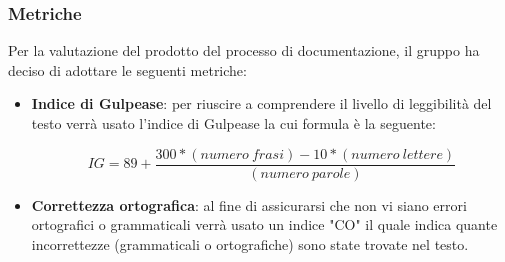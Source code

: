 \subsubsection{Metriche}
Per la valutazione del prodotto del processo di documentazione, il gruppo ha deciso di adottare le seguenti metriche:
\begin{itemize}
	\item \textbf{Indice di Gulpease}: per riuscire a comprendere il livello di leggibilità del testo verrà usato l'indice di Gulpease la cui formula è la seguente:
\begin{center}
\[IG=89+\frac{300*(numero \ frasi)-10*(numero \ lettere)}{(numero \ parole)}\]
\end{center}
	\item \textbf{Correttezza ortografica}: al fine di assicurarsi che non vi siano errori ortografici o grammaticali verrà usato un indice "CO" il quale indica quante incorrettezze (grammaticali o ortografiche) sono state trovate nel testo.
\end{itemize}


 